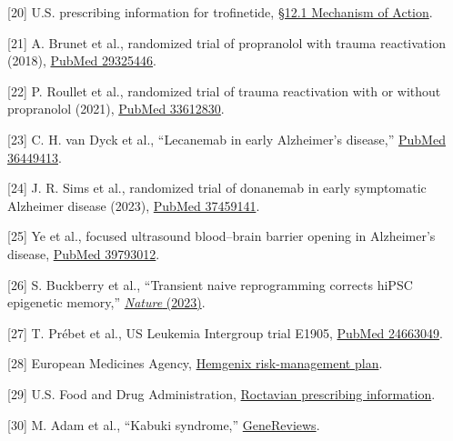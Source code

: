 \documentclass[
]{article}
\begin{document}
{[}20{]} U.S. prescribing information for trofinetide,
\href{https://dailymed.nlm.nih.gov/dailymed/fda/fdaDrugXsl.cfm?setid=67e6f2d9-21f6-466f-9def-826c6a4b8257}{§12.1
Mechanism of Action}.

{[}21{]} A. Brunet et al., randomized trial of propranolol with trauma
reactivation (2018),
\href{https://pubmed.ncbi.nlm.nih.gov/29325446/}{PubMed 29325446}.

{[}22{]} P. Roullet et al., randomized trial of trauma reactivation with
or without propranolol (2021),
\href{https://pubmed.ncbi.nlm.nih.gov/33612830/}{PubMed 33612830}.

{[}23{]} C. H. van Dyck et al., ``Lecanemab in early Alzheimer's
disease,'' \href{https://pubmed.ncbi.nlm.nih.gov/36449413/}{PubMed
36449413}.

{[}24{]} J. R. Sims et al., randomized trial of donanemab in early
symptomatic Alzheimer disease (2023),
\href{https://pubmed.ncbi.nlm.nih.gov/37459141/}{PubMed 37459141}.

{[}25{]} Ye et al., focused ultrasound blood--brain barrier opening in
Alzheimer's disease,
\href{https://pubmed.ncbi.nlm.nih.gov/39793012/}{PubMed 39793012}.

{[}26{]} S. Buckberry et al., ``Transient naive reprogramming corrects
hiPSC epigenetic memory,''
\href{https://www.nature.com/articles/s41586-023-06424-7}{\emph{Nature}
(2023)}.

{[}27{]} T. Prébet et al., US Leukemia Intergroup trial E1905,
\href{https://pubmed.ncbi.nlm.nih.gov/24663049/}{PubMed 24663049}.

{[}28{]} European Medicines Agency,
\href{https://www.ema.europa.eu/en/documents/rmp/hemgenix-epar-risk-management-plan_en.pdf}{Hemgenix
risk-management plan}.

{[}29{]} U.S. Food and Drug Administration,
\href{https://www.fda.gov/media/169937/download}{Roctavian prescribing
information}.

{[}30{]} M. Adam et al., ``Kabuki syndrome,''
\href{https://www.ncbi.nlm.nih.gov/books/NBK62111/}{GeneReviews}.
\end{document}
